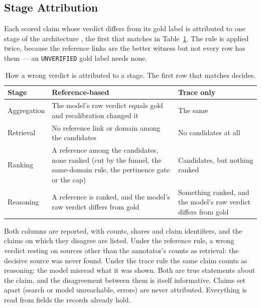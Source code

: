 
\subsection{Stage Attribution}
\label{subsec:harness-attribution}

Each scored claim whose verdict differs from its gold label is
attributed to one stage of the architecture \cite{guo2022survey}, the
first that matches in Table~\ref{tab:attribution}. The rule is applied
twice, because the reference links are the better witness but not
every row has them --- an \texttt{UNVERIFIED} gold label needs none.

\begin{table}[ht]
\centering
\small
\caption{How a wrong verdict is attributed to a stage. The first row
that matches decides.}
\label{tab:attribution}
\begin{tabularx}{\linewidth}{@{}lXX@{}}
\toprule
\textbf{Stage} & \textbf{Reference-based} & \textbf{Trace only} \\
\midrule
Aggregation & The model's raw verdict equals gold and recalibration
changed it & The same \\
Retrieval & No reference link or domain among the candidates & No
candidates at all \\
Ranking & A reference among the candidates, none ranked (cut by the
funnel, the same-domain rule, the pertinence gate or the cap) &
Candidates, but nothing ranked \\
Reasoning & A reference is ranked, and the model's raw verdict differs
from gold & Something ranked, and the model's raw verdict differs from
gold \\
\bottomrule
\end{tabularx}
\end{table}

Both columns are reported, with counts, shares and claim identifiers,
and the claims on which they disagree are listed. Under the reference
rule, a wrong verdict resting on sources other than the annotator's
counts as retrieval: the decisive source was never found. Under the
trace rule the same claim counts as reasoning: the model misread what
it was shown. Both are true statements about the claim, and the
disagreement between them is itself informative. Claims set apart
(search or model unreachable, errors) are never attributed. Everything
is read from fields the records already hold.


